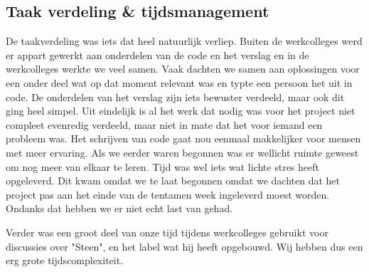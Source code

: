 \documentclass{article}
\begin{document}
\subsection{Taak verdeling \& tijdsmanagement}

De taakverdeling was iets dat heel natuurlijk verliep. Buiten de werkcolleges werd er appart gewerkt aan onderdelen van de code en het verslag en in de werkcolleges werkte we veel samen. Vaak dachten we samen aan oplossingen voor een onder deel wat op dat moment relevant was en typte een persoon het uit in code. De onderdelen van het verslag zijn iets bewuster verdeeld, maar ook dit ging heel simpel. Uit eindelijk is al het werk dat nodig was voor het project niet compleet evenredig verdeeld, maar niet in mate dat het voor iemand een probleem was. Het schrijven van code gaat nou eenmaal makkelijker voor mensen met meer ervaring. Als we eerder waren begonnen was er wellicht ruimte geweest om nog meer van elkaar te leren. \newline
Tijd was wel iets wat lichte stres heeft opgeleverd. Dit kwam omdat we te laat begonnen omdat we dachten dat het project pas aan het einde van de tentamen week ingeleverd moest worden. Ondanks dat hebben we er niet echt last van gehad.


Verder was een groot deel van onze tijd tijdens werkcolleges gebruikt voor discussies over "Steen", en het label wat hij heeft opgebouwd. Wij hebben dus een erg grote tijdscomplexiteit. 
\end{document}
